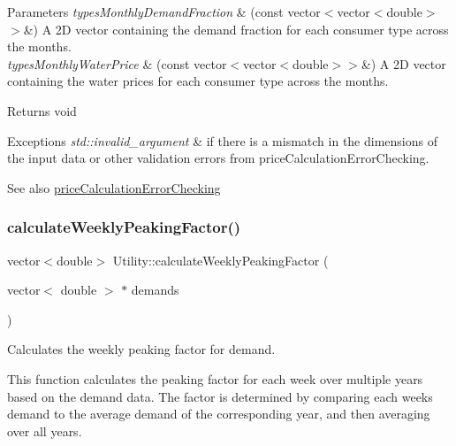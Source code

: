 \begin{DoxyParams}{Parameters}
{\em types\+Monthly\+Demand\+Fraction} & (const vector$<$vector$<$double$>$$>$\&) A 2D vector containing the demand fraction for each consumer type across the months. \\
\hline
{\em types\+Monthly\+Water\+Price} & (const vector$<$vector$<$double$>$$>$\&) A 2D vector containing the water prices for each consumer type across the months.\\
\hline
\end{DoxyParams}
\begin{DoxyReturn}{Returns}
void
\end{DoxyReturn}

\begin{DoxyExceptions}{Exceptions}
{\em std\+::invalid\+\_\+argument} & if there is a mismatch in the dimensions of the input data or other validation errors from price\+Calculation\+Error\+Checking.\\
\hline
\end{DoxyExceptions}
\begin{DoxySeeAlso}{See also}
\mbox{\hyperlink{classUtility_a01ec91140b9d23bf5b03e0fc55bced0d}{price\+Calculation\+Error\+Checking}} 
\end{DoxySeeAlso}
\mbox{\label{classUtility_a54c8621f2cce5257343f8dc6bfd76cff}} 
\subsubsection{\texorpdfstring{calculate\+Weekly\+Peaking\+Factor()}{calculateWeeklyPeakingFactor()}}
{\footnotesize\ttfamily vector$<$double$>$ Utility\+::calculate\+Weekly\+Peaking\+Factor (\begin{DoxyParamCaption}\item[{vector$<$ double $>$ $\ast$}]{demands }\end{DoxyParamCaption})}



Calculates the weekly peaking factor for demand. 

This function calculates the peaking factor for each week over multiple years based on the demand data. The factor is determined by comparing each week\textquotesingle{}s demand to the average demand of the corresponding year, and then averaging over all years.


